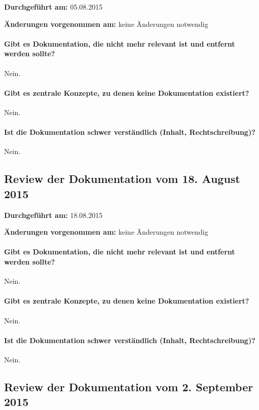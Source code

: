 \textbf{Durchgeführt am:} 05.08.2015

\textbf{Änderungen vorgenommen am:} keine Änderungen notwendig

\paragraph{Gibt es Dokumentation, die nicht mehr relevant ist und entfernt werden sollte?}
Nein.

\paragraph{Gibt es zentrale Konzepte, zu denen keine Dokumentation existiert?}
Nein.

\paragraph{Ist die Dokumentation schwer verständlich (Inhalt, Rechtschreibung)?}
Nein.


\subsection{Review der Dokumentation vom 18. August 2015}

\textbf{Durchgeführt am:} 18.08.2015

\textbf{Änderungen vorgenommen am:} keine Änderungen notwendig

\paragraph{Gibt es Dokumentation, die nicht mehr relevant ist und entfernt werden sollte?}
Nein.

\paragraph{Gibt es zentrale Konzepte, zu denen keine Dokumentation existiert?}
Nein.

\paragraph{Ist die Dokumentation schwer verständlich (Inhalt, Rechtschreibung)?}
Nein.


\subsection{Review der Dokumentation vom 2. September 2015}


